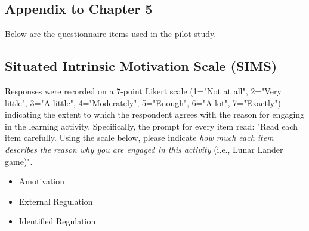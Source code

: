 \begin{subappendices}

\chapter*{Appendix to Chapter 5}\label{CH5A}

Below are the questionnaire items used in the pilot study.

\section{Situated Intrinsic Motivation Scale (SIMS)} Responses were recorded on a 7-point Likert scale (1="Not at all", 2="Very little", 3="A little", 4="Moderately", 5="Enough", 6="A lot", 7="Exactly") indicating the extent to which the respondent agrees with the reason for engaging in the learning activity. Specifically, the prompt for every item read: "Read each item carefully. Using the scale below, please indicate \textit{how much each item describes the reason why you are engaged in this activity} (i.e., Lunar Lander game)".
\begin{itemize}
    \item Amotivation
    \item External Regulation
    \item Identified Regulation
\end{itemize}
\end{subappendices}
